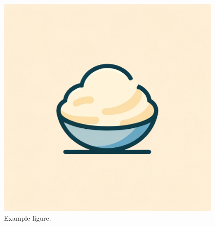 \documentclass[11pt]{article}
\begin{document}

\begin{figure}[H]
    \centering
    \includegraphics[scale=.6]{figures/potesala.png}
    \caption{Example figure.}
    \label{fig:1}
\end{figure}

\end{document}
